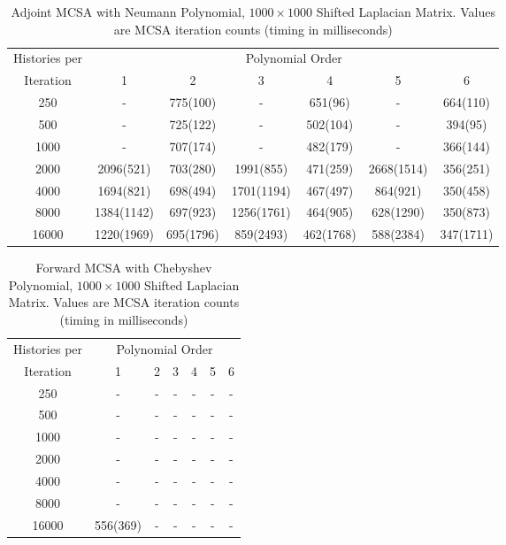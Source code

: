 \documentclass[10pt]{article}
\begin{document}
\begin{table}
\caption{Adjoint MCSA with Neumann Polynomial, $1000 \times 1000$ Shifted Laplacian Matrix.
Values are MCSA iteration counts (timing in milliseconds)
\label{tab:lap_adjoint_neumann}}
\centering
\begin{tabular}{ccccccc}
\toprule
Histories per & \multicolumn{6}{c}{Polynomial Order} \\
Iteration & 1 & 2 & 3 & 4 & 5 & 6 \\
\midrule
250 & - & 775(100) & - & 651(96) & - & 664(110) \\
500 & - & 725(122) & - & 502(104) & - & 394(95) \\
1000 & - & 707(174) & - & 482(179) & - & 366(144) \\
2000 & 2096(521) & 703(280) & 1991(855) & 471(259) & 2668(1514) & 356(251) \\
4000 & 1694(821) & 698(494) & 1701(1194) & 467(497) & 864(921) & 350(458) \\
8000 & 1384(1142) & 697(923) & 1256(1761) & 464(905) & 628(1290) & 350(873) \\
16000 & 1220(1969) & 695(1796) & 859(2493) & 462(1768) & 588(2384) & 347(1711) \\
\bottomrule
\end{tabular}
\end{table}

\begin{table}
\caption{Forward MCSA with Chebyshev Polynomial, $1000 \times 1000$ Shifted Laplacian Matrix.
Values are MCSA iteration counts (timing in milliseconds)
\label{tab:lap_forward_cheby}}
\centering
\begin{tabular}{ccccccc}
\toprule
Histories per & \multicolumn{6}{c}{Polynomial Order} \\
Iteration & 1 & 2 & 3 & 4 & 5 & 6 \\
\midrule
250 & - & - & - & - & - & - \\
500 & - & - & - & - & - & - \\
1000 & - & - & - & - & - & - \\
2000 & - & - & - & - & - & - \\
4000 & - & - & - & - & - & - \\
8000 & - & - & - & - & - & - \\
16000 & 556(369) & - & - & - & - & - \\
\bottomrule
\end{tabular}
\end{table}
\end{document}
